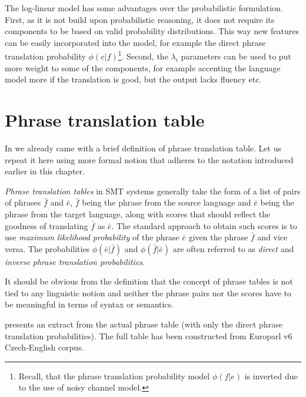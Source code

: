 The log-linear model has some advantages over the probabilistic formulation.
First, as it is not build upon probabilistic reasoning, it does not require its
components to be based on valid probability distributions.
This way new features can be easily incorporated into the model, for example the direct
phrase translation probability $\phi(e|f)$\footnote{Recall, that the phrase translation
probability model $\phi(f|e)$ is inverted due to the use of noisy channel model.}.
Second, the $\lambda_i$ parameters can be used to put more weight to some of the components,
for example accenting the language model more if the translation is good, but the output
lacks fluency etc.

\section{Phrase translation table}


In  we already came with a brief definition of phrase
translation table. Let us repeat it here using more formal notion that adheres
to the notation introduced earlier in this chapter.

\emph{Phrase translation tables} in SMT systems generally take the form of a list of
pairs of phrases $\bar{f}$ and $\bar{e}$, $\bar{f}$ being the phrase from the source
language and $\bar{e}$ being the phrase from the target language, along with scores
that should reflect the goodness of translating $\bar{f}$ as $\bar{e}$.
The standard approach to obtain such scores is to use \emph{maximum likelihood
probability} of the phrase $\bar{e}$ given the phrase $\bar{f}$ and vice versa.
The probabilities $\phi(\bar{e}|\bar{f})$ and $\phi(\bar{f}|\bar{e})$ are often
referred to as \emph{direct} and \emph{inverse} \emph{phrase translation probabilities}.

It should be obvious from the definition that the concept of phrase tables is not tied
to any linguistic notion and neither the phrase pairs nor the scores have to be meaningful
in terms of syntax or semantics.

 presents an extract from the actual phrase table
(with only the direct phrase translation probabilities).
The full table has been constructed from Europarl v6 Czech-English
corpus.

